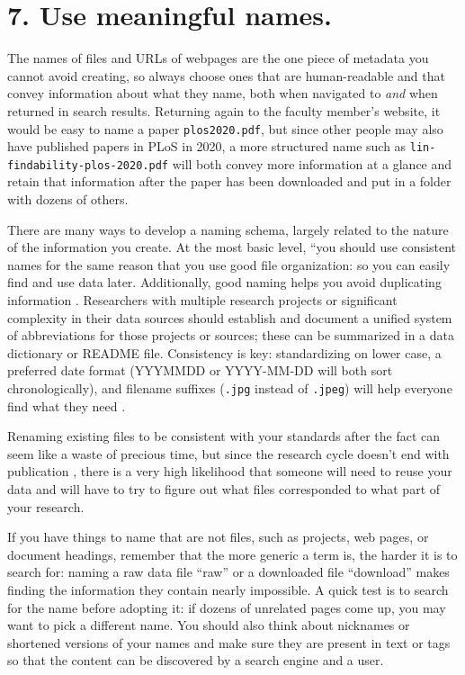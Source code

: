 \documentclass[10pt,letterpaper]{article}
\newcommand{\rulemajor}[1]{\section*{#1}}
\begin{document}
\rulemajor{7. Use meaningful names.}

The names of files and URLs of webpages are the one piece of metadata you cannot
avoid creating, so always choose ones that are human-readable and that convey
information about what they name, both when navigated to \emph{and} when
returned in search results. Returning again to the faculty member's website, it
would be easy to name a paper \texttt{plos2020.pdf}, but since other people may
also have published papers in PLoS in 2020, a more structured name such as
\texttt{lin-findability-plos-2020.pdf} will both convey more information at a
glance and retain that information after the paper has been downloaded and put
in a folder with dozens of others.

There are many ways to develop a naming schema, largely related to the nature of
the information you create. At the most basic level, ``you should use consistent
names for the same reason that you use good file organization: so you can easily
find and use data later. Additionally, good naming helps you avoid duplicating
information \cite{Briney2015}. Researchers with multiple research projects or
significant complexity in their data sources should establish and document a
unified system of abbreviations for those projects or sources; these can be
summarized in a data dictionary or README file. Consistency is key:
standardizing on lower case, a preferred date format (YYYMMDD or YYYY-MM-DD will
both sort chronologically), and filename suffixes (\texttt{.jpg} instead of
\texttt{.jpeg}) will help everyone find what they need \cite{Wilson2014,Wilson2017}.

Renaming existing files to be consistent with your standards after the fact can
seem like a waste of precious time, but since the research cycle doesn't end
with publication \cite{Briney2015}, there is a very high likelihood that someone
will need to reuse your data and will have to try to figure out what files
corresponded to what part of your research.

If you have things to name that are not files, such as projects, web pages, or
document headings, remember that the more generic a term is, the harder it is to
search for: naming a raw data file ``raw'' or a downloaded file ``download''
makes finding the information they contain nearly impossible. A quick test is to
search for the name before adopting it: if dozens of unrelated pages come up,
you may want to pick a different name. You should also think about nicknames or
shortened versions of your names and make sure they are present in text or tags
so that the content can be discovered by a search engine and a user.
\end{document}
